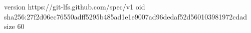 version https://git-lfs.github.com/spec/v1
oid sha256:27f2d06ec76550adff5295b485ad1e1e9007ad96dedaf52d560103981972cdad
size 60

